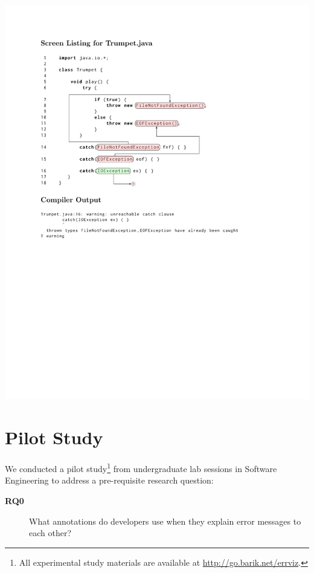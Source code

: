 \documentclass[conference]{IEEEtran}
\begin{document}
\includegraphics{trumpet_explain_crop.pdf}



\section{Pilot Study}
\label{sec:pilotstudy}

We conducted a pilot study\footnote{All experimental study materials are available at \url{http://go.barik.net/errviz}.} from undergraduate lab sessions in Software Engineering to address a pre-requisite research question:
\begin{description}
\item[\textbf{RQ0}] What annotations do developers use when they explain error messages to each other?
\end{description}
\end{document}

